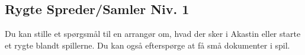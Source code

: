 \subsection{Rygte Spreder/Samler Niv. 1}
Du kan stille et spørgsmål til en arrangør om, hvad der sker i Akastin eller starte et rygte blandt spillerne. Du kan også efterspørge at få små dokumenter i spil.